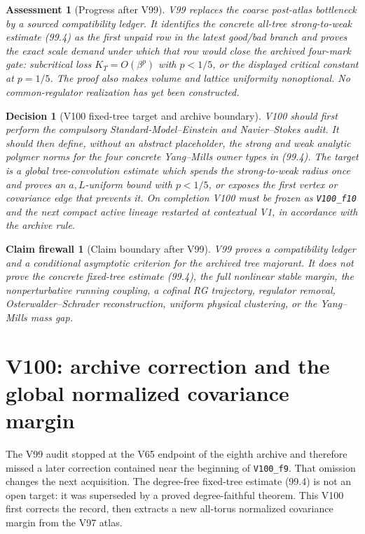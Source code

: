 \documentclass[11pt,oneside]{article}
\newtheorem{assessment}[theorem]{Assessment}
\newtheorem{firewall}[theorem]{Claim firewall}
\newtheorem{decision}[theorem]{Decision}
\theoremstyle{definition}
\theoremstyle{remark}
\begin{document}
\begin{assessment}[Progress after V99]
\label{ass:newv99}
V99 replaces the coarse post-atlas bottleneck by a sourced
compatibility ledger.  It identifies the concrete all-tree
strong-to-weak estimate (99.4) as the first unpaid row in the
latest good/bad branch and proves the exact scale demand under which
that row would close the archived four-mark gate: subcritical loss
\(K_T=O(\beta^p)\) with \(p<1/5\), or the displayed critical
constant at \(p=1/5\).  The proof also makes volume and lattice
uniformity nonoptional.  No common-regulator realization has yet
been constructed.
\end{assessment}

\begin{decision}[V100 fixed-tree target and archive boundary]
\label{dec:newv99-next}
V100 should first perform the compulsory Standard-Model--Einstein
and Navier--Stokes audit.  It should then define, without an
abstract placeholder, the strong and weak analytic polymer norms
for the four concrete Yang--Mills owner types in (99.4).  The target
is a global tree-convolution estimate which spends the
strong-to-weak radius once and proves an \(a,L\)-uniform bound with
\(p<1/5\), or exposes the first vertex or covariance edge that
prevents it.  On completion V100 must be frozen as
\texttt{V100\_f10} and the next compact active lineage restarted at
contextual V1, in accordance with the archive rule.
\end{decision}

\begin{firewall}[Claim boundary after V99]
\label{fire:newv99-final}
V99 proves a compatibility ledger and a conditional asymptotic
criterion for the archived tree majorant.  It does not prove the
concrete fixed-tree estimate (99.4), the full nonlinear stable
margin, the nonperturbative running coupling, a cofinal RG
trajectory, regulator removal, Osterwalder--Schrader reconstruction,
uniform physical clustering, or the Yang--Mills mass gap.
\end{firewall}

\section*{V100: archive correction and the global normalized covariance margin}
\label{sec:newv100-correction}

The V99 audit stopped at the V65 endpoint of the eighth archive and
therefore missed a later correction contained near the beginning of
\texttt{V100\_f9}.  That omission changes the next acquisition.
The degree-free fixed-tree estimate (99.4) is not an open target:
it was superseded by a proved degree-faithful theorem.  This V100
first corrects the record, then extracts a new all-torus normalized
covariance margin from the V97 atlas.
\end{document}

